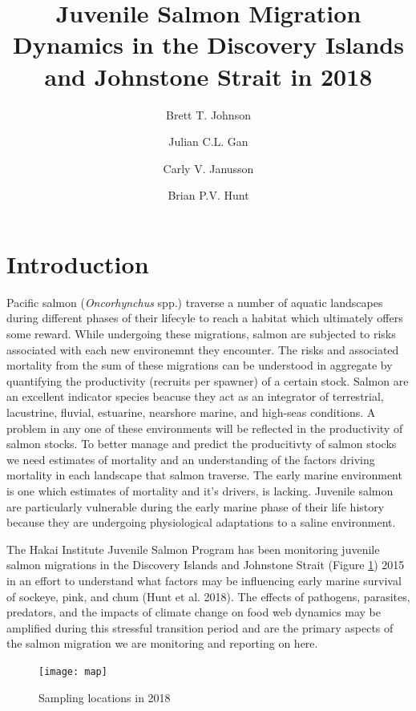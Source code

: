 \documentclass[fleqn,10pt]{wlpeerj} %
\title{Juvenile Salmon Migration Dynamics in the Discovery Islands and
Johnstone Strait in 2018}
\author[1]{Brett T. Johnson}
\author[]{Julian C.L. Gan}
\author[]{Carly V. Janusson}
\author[2, 3]{Brian P.V. Hunt}
\affil[1]{Hakai Institute Quadra Island Ecological Observatory, Heriot Bay, BC
V0P1H0}
\affil[2]{UBC EOS, IOF}
\begin{document}
\flushbottom
\maketitle
\thispagestyle{empty}

\section*{Introduction}\label{introduction}

Pacific salmon (\emph{Oncorhynchus} spp.) traverse a number of aquatic
landscapes during different phases of their lifecyle to reach a habitat
which ultimately offers some reward. While undergoing these migrations,
salmon are subjected to risks associated with each new environemnt they
encounter. The risks and associated mortality from the sum of these
migrations can be understood in aggregate by quantifying the
productivity (recruits per spawner) of a certain stock. Salmon are an
excellent indicator species beacuse they act as an integrator of
terrestrial, lacustrine, fluvial, estuarine, nearshore marine, and
high-seas conditions. A problem in any one of these environments will be
reflected in the productivity of salmon stocks. To better manage and
predict the producitivty of salmon stocks we need estimates of mortality
and an understanding of the factors driving mortality in each landscape
that salmon traverse. The early marine environment is one which
estimates of mortality and it's drivers, is lacking. Juvenile salmon are
particularly vulnerable during the early marine phase of their life
history because they are undergoing physiological adaptations to a
saline environment.

The Hakai Institute Juvenile Salmon Program has been monitoring juvenile
salmon migrations in the Discovery Islands and Johnstone Strait (Figure
\ref{fig:map}) 2015 in an effort to understand what factors may be
influencing early marine survival of sockeye, pink, and chum (Hunt et
al. 2018). The effects of pathogens, parasites, predators, and the
impacts of climate change on food web dynamics may be amplified during
this stressful transition period and are the primary aspects of the
salmon migration we are monitoring and reporting on here.

\begin{figure}

\texttt{[image: map]} \hfill{}

\caption{Sampling locations in 2018}\label{fig:map}
\end{figure}
\end{document}
